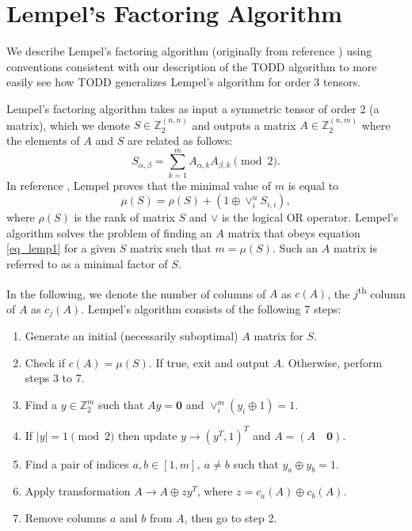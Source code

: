 \documentclass[notitlepage]{article}
\theoremstyle{definition}
\theoremstyle{problem}
\theoremstyle{lemma}
\begin{document}
	
	
	
	\appendix
	\section{Lempel's Factoring Algorithm}
	\label{ap_lempel}
	We describe Lempel's factoring algorithm (originally from reference \cite{8_Lempel_1975}) using conventions consistent with our description of the TODD algorithm to more easily see how TODD generalizes Lempel's algorithm for order 3 tensors.

	Lempel's factoring algorithm takes as input a symmetric tensor of order 2 (a matrix), which we denote $S\in \mathbb{Z}_2^{(n,n)}$ and outputs a matrix $A\in \mathbb{Z}_2^{(n,m)}$ where the elements of $A$ and $S$ are related as follows:
	\begin{equation}
		\label{eq_lemp1}
		S_{\alpha,\beta} = \sum_{k=1}^{m}A_{\alpha,k}A_{\beta,k} \pmod{2}.
	\end{equation}
	In reference \cite{8_Lempel_1975}, Lempel proves that the minimal value of $m$ is equal to
	\begin{equation}
	\mu(S) = \rho(S) + (1 \oplus \vee_i^nS_{i,i}),
	\end{equation}
	where $\rho(S)$ is the rank of matrix $S$ and $\vee$ is the logical OR operator.
	 Lempel's algorithm solves the problem of finding an $A$ matrix that obeys equation \ref{eq_lemp1} for a given $S$ matrix such that $m=\mu(S)$. Such an $A$ matrix is referred to as a minimal factor of $S$. 
		
	In the following, we denote the number of columns of $A$ as $c(A)$, the $j$\textsuperscript{th} column of $A$ as $c_j(A)$. Lempel's algorithm consists of the following 7 steps:
	\begin{enumerate}
		\item Generate an initial (necessarily suboptimal) $A$ matrix for $S$.
		\item Check if $c(A) = \mu(S)$. If true, exit and output $A$. Otherwise, perform steps 3 to 7.
		\item Find a $y\in\mathbb{Z}_2^m$ such that $Ay = \mathbf{0}$ and $\vee_i^m(y_{i}\oplus 1)=1$.
		\item If $|y|=1 \pmod{2}$ then update $y \rightarrow (y^T, 1)^T$ and $A = (A \quad \mathbf{0})$.
		\item Find a pair of indices $a,b\in [1,m], \ a\neq b$ such that $y_a \oplus y_b = 1$.
		\item Apply transformation $A \rightarrow A \oplus zy^T$, where $z=c_a(A) \oplus c_b(A)$.
		\item Remove columns $a$ and $b$ from $A$, then go to step 2.
	\end{enumerate}
\end{document}

